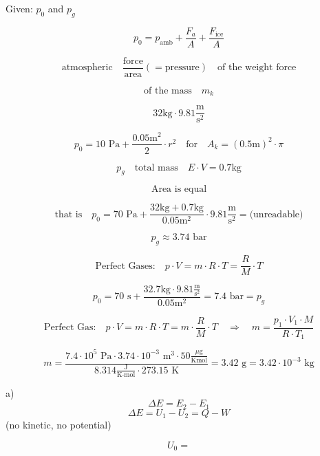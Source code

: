 Given: \( p_0 \) and \( p_g \)

\[
p_0 = p_{\text{amb}} + \frac{F_{a}}{A} + \frac{F_{\text{ice}}}{A}
\]

\[
\text{atmospheric} \quad \frac{\text{force}}{\text{area}} (= \text{pressure}) \quad \text{of the weight force}
\]

\[
\text{of the mass} \quad m_k
\]

\[
32 \text{kg} \cdot 9.81 \frac{\text{m}}{\text{s}^2}
\]

\[
p_0 = 10 \text{ Pa} + \frac{0.05 \text{m}^2}{2} \cdot r^2 \quad \text{for} \quad A_k = (0.5 \text{m})^2 \cdot \pi
\]

\[
p_g \quad \text{total mass} \quad E \cdot V = 0.7 \text{kg}
\]

\[
\text{Area is equal}
\]

\[
\text{that is} \quad p_0 = 70 \text{ Pa} + \frac{32 \text{kg} + 0.7 \text{kg}}{0.05 \text{m}^2} \cdot 9.81 \frac{\text{m}}{\text{s}^2} =  \text{(unreadable)}
\]

\[
p_g \approx 3.74 \text{ bar}
\]

\[
\text{Perfect Gases:} \quad p \cdot V = m \cdot R \cdot T = \frac{R}{M} \cdot T
\]

\[
p_0 = 70 \text{ s} + \frac{32.7 \text{kg} \cdot 9.81 \frac{\text{m}}{\text{s}^2}}{0.05 \text{m}^2} = 7.4 \text{ bar} = p_g
\]

\[
\text{Perfect Gas:} \quad p \cdot V = m \cdot R \cdot T = m \cdot \frac{R}{M} \cdot T \quad \Rightarrow \quad m = \frac{p_1 \cdot V_1 \cdot M}{R \cdot T_1}
\]

\[
m = \frac{7.4 \cdot 10^5 \text{ Pa} \cdot 3.74 \cdot 10^{-3} \text{ m}^3 \cdot 50 \frac{\mu \text{g}}{\text{Kmol}}}{8.314 \frac{\text{J}}{\text{K} \cdot \text{mol}} \cdot 273.15 \text{ K}} = 3.42 \text{ g} = 3.42 \cdot 10^{-3} \text{ kg}
\]

a) 
\[
\Delta E = E_2 - E_1
\]
\[
\Delta E = U_1 - U_2 = Q - W
\]
(no kinetic, no potential)

\[
U_0 =
\]